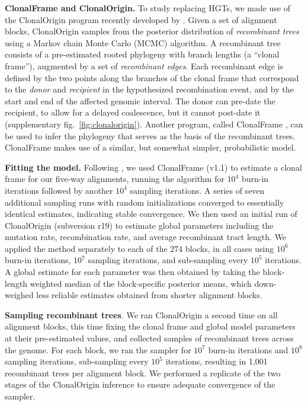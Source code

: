 \documentclass[12pt]{article}
\begin{document}
{\bf ClonalFrame and ClonalOrigin.}  To study replacing HGTs, we made use
of the ClonalOrigin program recently developed by \cite{Didelot2010}.
Given a set of alignment blocks, ClonalOrigin samples from the posterior
distribution of {\em recombinant trees} using a Markov chain Monte Carlo
(MCMC) algorithm.  A recombinant tree consists of a pre-estimated rooted
phylogeny with branch lengths (a ``clonal frame''), augmented by a set of
{\em recombinant edges}. Each recombinant edge is defined by the two points
along the branches of the clonal frame that correspond to the {\em donor}
and {\em recipient} in the hypothesized recombination event, and by the
start and end of the affected genomic interval.  The donor can pre-date the
recipient, to allow for a delayed coalescence, but it cannot post-date it
(supplementary fig.\ \ref{fig:clonalorigin}).
Another program, called ClonalFrame
\citep{Didelot2007}, can be used to infer the phylogeny that serves as the
basis of the recombinant trees.  ClonalFrame makes use of a similar, but
somewhat simpler, probabilistic model.

{\bf Fitting the model.}  Following \cite{Didelot2010}, we used ClonalFrame
(v1.1) to estimate a clonal frame for our five-way alignments, running the
algorithm for $10^4$ burn-in iterations followed by another $10^4$ sampling
iterations.  A series of seven additional sampling runs with random
initializations converged to essentially identical estimates, indicating
stable convergence.  We then used an initial run of ClonalOrigin
(subversion r19) to estimate global parameters including the mutation rate,
recombination rate, and average recombinant tract length. We applied the method
separately to each of the 274 blocks, in all cases using $10^6$ burn-in
iterations, $10^7$ sampling iterations, and sub-sampling every $10^5$
iterations. A global estimate for each parameter was then obtained by
taking the block-length weighted median of the block-specific posterior
means, which down-weighed less reliable estimates obtained from shorter
alignment blocks.

{\bf Sampling recombinant trees}.  We ran ClonalOrigin a second time on all
alignment blocks, this time fixing the clonal frame and global model
parameters at their pre-estimated values, and collected samples of
recombinant trees across the genome.  For each block, we ran the sampler
for $10^7$ burn-in iterations and $10^8$ sampling iterations, sub-sampling
every $10^5$ iterations, resulting in 1,001 recombinant trees per alignment
block.  We performed a replicate of the two stages of the ClonalOrigin
inference to ensure adequate convergence of the sampler.
\end{document}
